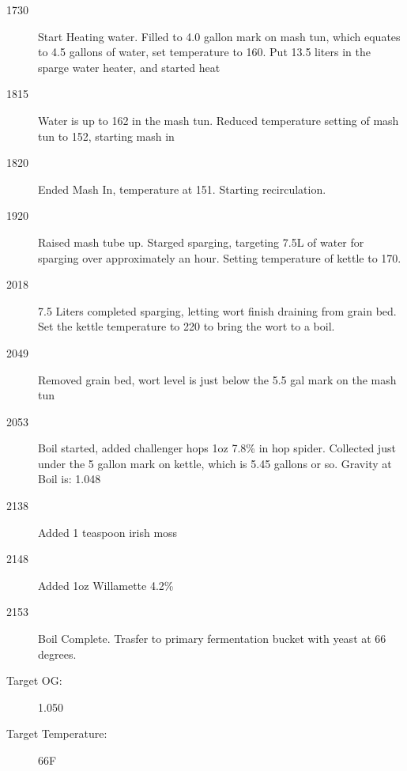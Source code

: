 \FloatBarrier{}
\begin{description}
    \item[1730] Start Heating water.  Filled to 4.0 gallon mark on mash tun, which equates to 4.5 gallons of water, set temperature to 160.  Put 13.5 liters in the sparge water heater, and started heat
    \item[1815] Water is up to 162 in the mash tun. Reduced temperature setting of mash tun to 152, starting mash in
    \item[1820] Ended Mash In, temperature at 151.  Starting recirculation.
    \item[1920] Raised mash tube up. Starged sparging, targeting 7.5L of water for sparging over approximately an hour.  Setting temperature of kettle to 170.
    \item[2018] 7.5 Liters completed sparging, letting wort finish draining from grain bed.  Set the kettle temperature to 220 to bring the wort to a boil.
    \item[2049] Removed grain bed, wort level is just below the 5.5 gal mark on the mash tun
    \item[2053] Boil started, added challenger hops 1oz 7.8\% in hop spider.  Collected just under the 5 gallon mark on kettle, which is 5.45 gallons or so.  Gravity at Boil is: 1.048
    \item[2138] Added 1 teaspoon irish moss
    \item[2148] Added 1oz Willamette 4.2\%
    \item[2153] Boil Complete.  Trasfer to primary fermentation bucket with yeast at 66 degrees.
\end{description}

\begin{description}
    \item[Target OG:] 1.050
    \item[Target Temperature:] 66F
\end{description}

\def\todaysdate{20190807}
\newday{\todaysdate}\label{\todaysdate}


